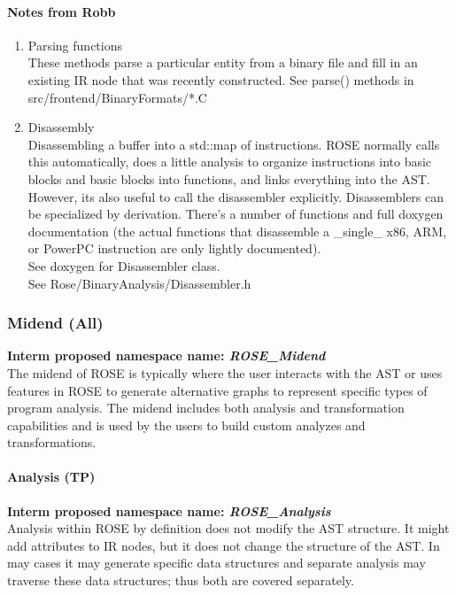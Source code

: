 \paragraph{Notes from Robb}
\begin{enumerate}
	\item Parsing functions \\
   These methods parse a particular entity from a binary file and
   fill in an existing IR node that was recently constructed.
   See parse() methods in src/frontend/BinaryFormats/*.C
   \item Disassembly \\
   Disassembling a buffer into a std::map of instructions.  ROSE
   normally calls this automatically, does a little analysis to
   organize instructions into basic blocks and basic blocks into
   functions, and links everything into the AST. However, its
   also useful to call the disassembler explicitly. Disassemblers
   can be specialized by derivation. There's a number of
   functions and full doxygen documentation (the actual functions
   that disassemble a \_single\_ x86, ARM, or PowerPC instruction
   are only lightly documented). \\
   See doxygen for Disassembler class. \\
   See Rose/BinaryAnalysis/Disassembler.h
\end{enumerate}


\subsubsection{Midend (All)}
{\bf Interm proposed namespace name: {\em ROSE\_Midend}} \\
   The midend of ROSE is typically where the user interacts with the AST
or uses features in ROSE to generate alternative graphs to represent
specific types of program analysis. The midend includes both analysis
and transformation capabilities and is used by the users to build 
custom analyzes and transformations.

\paragraph{Analysis (TP)}
{\bf Interm proposed namespace name: {\em ROSE\_Analysis}} \\
   Analysis within ROSE by definition does not modify the AST structure.
It might add attributes to IR nodes, but it does not change the structure 
of the AST.  In may cases it may generate specific data structures and
separate analysis may traverse these data structures; thus both are covered
separately.

